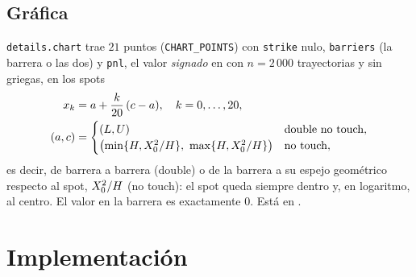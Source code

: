 \subsection{Gráfica}\label{sec:cap15-grafica}

\texttt{details.chart} trae $21$ puntos (\texttt{CHART\_POINTS}) con \texttt{strike} nulo, \texttt{barriers} (la barrera o las dos) y
\texttt{pnl}, el valor \emph{signado} en \MXN{} con $n=2\,000$ trayectorias y sin griegas, en los spots
\begin{equation}\label{eq:cap15-grafica}
  \begin{aligned}
  x_k&=a+\frac{k}{20}\,(c-a),\quad k=0,\dots,20,\\
  (a,c)&=\begin{cases}(L,U)&\text{double no touch},\\
  \bigl(\min\{H,X_0^2/H\},\ \max\{H,X_0^2/H\}\bigr)&\text{no touch},\end{cases}
  \end{aligned}
\end{equation}
es decir, de barrera a barrera (double) o de la barrera a su espejo geométrico respecto al spot, $X_0^2/H$ (no touch): el spot queda siempre dentro y, en
logaritmo, al centro. El valor en la barrera es exactamente $0$. Está en .

\section{Implementación}\label{sec:cap15-implementacion}

